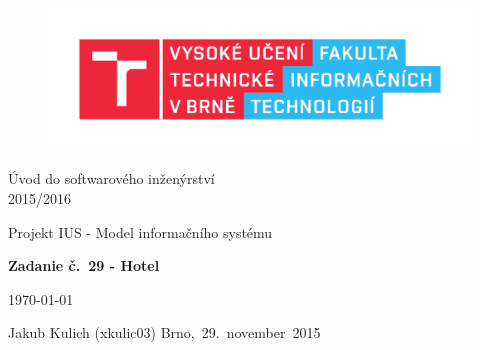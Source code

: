 \begin{titlepage}

\begin{figure}[!h]
  \centering
  \includegraphics[width=\linewidth]{src/logo}
\end{figure}

\vfill

\begin{center}
  \begin{Large}
    Úvod do softwarového inženýrství \\
    2015/2016 \\
  \end{Large}
  \vspace{10mm}
  \begin{huge}
    Projekt IUS - Model informačního systému \\
  \end{huge}
  \vspace{10mm}
  \begin{Large}
    \textbf{Zadanie č.~29 - Hotel}
  \end{Large}

\end{center}

\vfill

\begin{center}
  \begin{Large}
  \today
  \end{Large}
\end{center}

\vfill

\begin{large}
  Jakub Kulich (xkulic03) \hfill Brno,~29.~november~2015
\end{large}

\end{titlepage}
